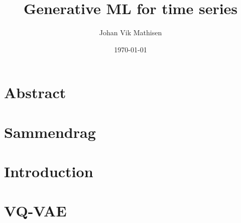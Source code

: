 \documentclass[british,titlepage]{ntnuthesis}
\title{Generative ML for time series}
\author{Johan Vik Mathisen}
\date{\today}
\begin{document}
\chapter*{Abstract}

\chapter*{Sammendrag}



%

\tableofcontents
\listoffigures
\listoftables
\lstlistoflistings

\printglossary[type=\acronymtype] %
\printglossary                    %

\chapter{Introduction}


\chapter{VQ-VAE}




\chapter*{\bibname}
\printbibliography[heading=none]



\appendix

\end{document}
